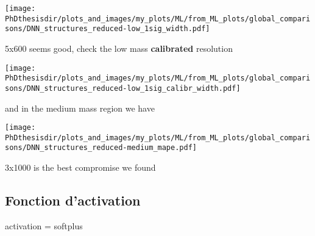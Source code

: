 \texttt{[image: \\PhDthesisdir/plots\_and\_images/my\_plots/ML/from\_ML\_plots/global\_comparisons/DNN\_structures\_reduced-low\_1sig\_width.pdf]}

5x600 seems good, check the low mass \textbf{calibrated} resolution

\texttt{[image: \\PhDthesisdir/plots\_and\_images/my\_plots/ML/from\_ML\_plots/global\_comparisons/DNN\_structures\_reduced-low\_1sig\_calibr\_width.pdf]}

and in the medium mass region we have

\texttt{[image: \\PhDthesisdir/plots\_and\_images/my\_plots/ML/from\_ML\_plots/global\_comparisons/DNN\_structures\_reduced-medium\_mape.pdf]}

3x1000 is the best compromise we found

\subsection{Fonction d'activation}

activation = softplus

